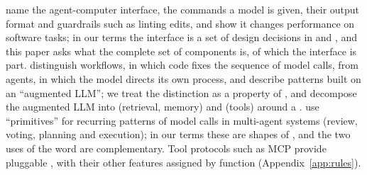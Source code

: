 \citet{yang2024sweagent} name the agent-computer interface, the commands a model is given, their output format and guardrails such as linting edits, and show it changes performance on software tasks; in our terms the interface is a set of design decisions in  and , and this paper asks what the complete set of components is, of which the interface is part. \citet{anthropic2024effective} distinguish workflows, in which code fixes the sequence of model calls, from agents, in which the model directs its own process, and describe patterns built on an ``augmented LLM''; we treat the distinction as a property of , and decompose the augmented LLM into  (retrieval, memory) and  (tools) around a . \citet{jin2026agentprimitives} use ``primitives'' for recurring patterns of model calls in multi-agent systems (review, voting, planning and execution); in our terms these are shapes of , and the two uses of the word are complementary. Tool protocols such as MCP \citep{mcp} provide pluggable , with their other features assigned by function (Appendix~\ref{app:rules}).
